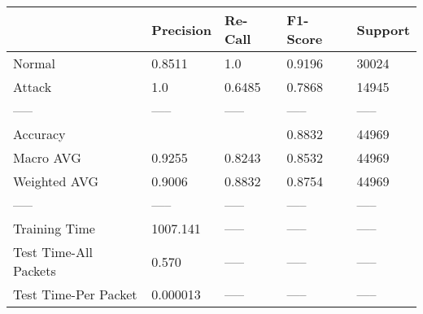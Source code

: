 \begin{tabular}{lllll}
\toprule
{} & Precision & Re-Call & F1-Score & Support \\
\midrule
Normal                &    0.8511 &     1.0 &   0.9196 &   30024 \\
Attack                &       1.0 &  0.6485 &   0.7868 &   14945 \\
-----                 &     ----- &   ----- &    ----- &   ----- \\
Accuracy              &           &         &   0.8832 &   44969 \\
Macro AVG             &    0.9255 &  0.8243 &   0.8532 &   44969 \\
Weighted AVG          &    0.9006 &  0.8832 &   0.8754 &   44969 \\
-----                 &     ----- &   ----- &    ----- &   ----- \\
Training Time         &  1007.141 &   ----- &    ----- &   ----- \\
Test Time-All Packets &     0.570 &   ----- &    ----- &   ----- \\
Test Time-Per Packet  &  0.000013 &   ----- &    ----- &   ----- \\
\bottomrule
\end{tabular}
